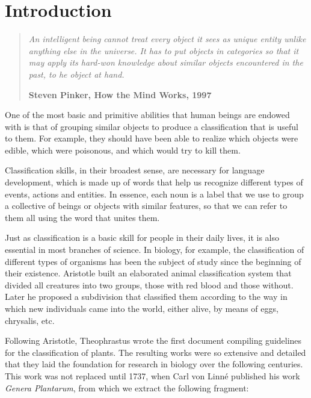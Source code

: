 
\chapter{Introduction}\label{ch:introduction}

\begin{quotation}{\slshape
		An intelligent being cannot treat every object it sees as unique entity unlike anything else in the universe. It has to put objects in categories so that it may apply its hard-won knowledge about similar objects encountered in the past, to he object at hand.}
		\begin{flushright}
			\textbf{Steven Pinker, How the Mind Works, 1997} 
		\end{flushright}
\end{quotation}

One of the most basic and primitive abilities that human beings are endowed with is that of grouping similar objects to produce a classification that is useful to them. For example, they should have been able to realize which objects were edible, which were poisonous, and which would try to kill them.

Classification skills, in their broadest sense, are necessary for language development, which is made up of words that help us recognize different types of events, actions and entities. In essence, each noun is a label that we use to group a collective of beings or objects with similar features, so that we can refer to them all using the word that unites them.

Just as classification is a basic skill for people in their daily lives, it is also essential in most branches of science. In biology, for example, the classification of different types of organisms has been the subject of study since the beginning of their existence. Aristotle built an elaborated animal classification system that divided all creatures into two groups, those with red blood and those without. Later he proposed a subdivision that classified them according to the way in which new individuals came into the world, either alive, by means of eggs, chrysalis, etc.

Following Aristotle, Theophrastus wrote the first document compiling guidelines for the classification of plants. The resulting works were so extensive and detailed that they laid the foundation for research in biology over the following centuries. This work was not replaced until 1737, when Carl von Linné published his work \textit{Genera Plantarum}, from which we extract the following fragment:


